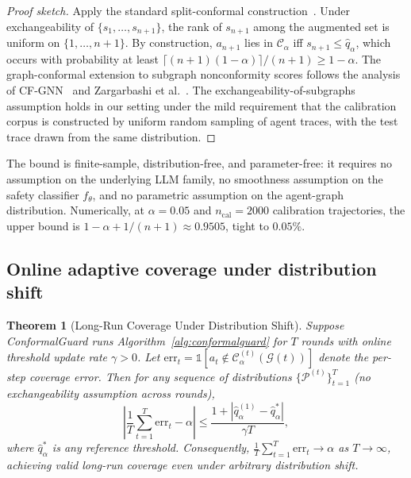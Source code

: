 \documentclass[12pt,a4paper]{article}
\newtheorem{theorem}{Theorem}
\theoremstyle{definition}
\theoremstyle{remark}
\newcommand{\modelname}{ConformalGuard}
\newcommand{\Ccal}{\mathcal{C}}
\newcommand{\Pcal}{\mathcal{P}}
\newcommand{\Gcal}{\mathcal{G}}
\begin{document}
\begin{proof}[Proof sketch]
Apply the standard split-conformal construction~\cite{vovk2005algorithmic,lei2018distribution}. Under exchangeability of $\{s_1, \ldots, s_{n+1}\}$, the rank of $s_{n+1}$ among the augmented set is uniform on $\{1, \ldots, n+1\}$. By construction, $a_{n+1}$ lies in $\Ccal_\alpha$ iff $s_{n+1} \leq \hat{q}_\alpha$, which occurs with probability at least $\lceil (n+1)(1-\alpha) \rceil / (n+1) \geq 1 - \alpha$. The graph-conformal extension to subgraph nonconformity scores follows the analysis of CF-GNN~\cite{huang2023cfgnn} and Zargarbashi et al.~\cite{zargarbashi2023conformal}. The exchangeability-of-subgraphs assumption holds in our setting under the mild requirement that the calibration corpus is constructed by uniform random sampling of agent traces, with the test trace drawn from the same distribution.
\end{proof}

The bound is finite-sample, distribution-free, and parameter-free: it requires no assumption on the underlying LLM family, no smoothness assumption on the safety classifier $f_\theta$, and no parametric assumption on the agent-graph distribution. Numerically, at $\alpha = 0.05$ and $n_{\mathrm{cal}} = 2000$ calibration trajectories, the upper bound is $1-\alpha + 1/(n+1) \approx 0.9505$, tight to $0.05\%$.

\subsection{Online adaptive coverage under distribution shift}

\begin{theorem}[Long-Run Coverage Under Distribution Shift]
\label{thm:online}
Suppose \modelname{} runs Algorithm~\ref{alg:conformalguard} for $T$ rounds with online threshold update rate $\gamma > 0$. Let $\mathrm{err}_t = \mathbb{1}[a_t \notin \Ccal_\alpha^{(t)}(\Gcal(t))]$ denote the per-step coverage error. Then for any sequence of distributions $\{\Pcal^{(t)}\}_{t=1}^{T}$ (no exchangeability assumption across rounds),
\begin{equation}
    \left|\frac{1}{T}\sum_{t=1}^{T}\mathrm{err}_t - \alpha\right| \leq \frac{1 + |\hat{q}_\alpha^{(1)} - \hat{q}_\alpha^{*}|}{\gamma T},
\label{eq:online}
\end{equation}
where $\hat{q}_\alpha^{*}$ is any reference threshold. Consequently, $\frac{1}{T}\sum_{t=1}^{T}\mathrm{err}_t \to \alpha$ as $T \to \infty$, achieving valid long-run coverage even under arbitrary distribution shift.
\end{theorem}
\end{document}
